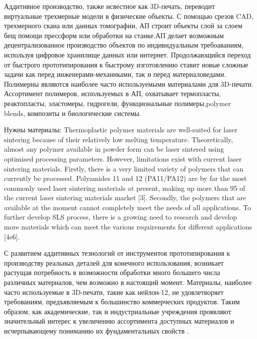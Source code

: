 

Аддитивное производство, также исвестное как 3D-печать, переводит виртуальные трехмерные модели в физические объекты. С помощью срезов CAD, трехмерного скана или данных томографии, АП строит объекты слой за слоем бещ помощи прессформ или обработки на станке.АП делает возможным децентрализованное производство объектов по индивидуальным требоаваниям, используя цифровое хранилище данных или интернет. 
Продолжающийся переход
от быстрого прототипирования к быстрому изготовлению ставит новые сложные задачи как перед инженерами-механиками, так и перед материаловедами.
Полимерны являются наиболее часто используемыми материалами для 3D-печати.
Ассортимент полимеров, используемых в АП, охватывает термопласты, реактопласты, эластомеры, гидрогели, функциональные полимеры,polymer blends, композиты и биологические системы.
\cite{3d-review}

Нужны материалы: 
Thermoplastic polymer materials are well-suited for laser sintering
because of their relatively low melting temperature. Theoretically,
almost any polymer available in powder form can be laser
sintered using optimised processing parameters. However, limitations
exist with current laser sintering materials. Firstly, there is a
very limited variety of polymers that can currently be processed.
Polyamides 11 and 12 (PA11/PA12) are by far the most commonly
used laser sintering materials at present, making up more than 95%
of the current laser sintering materials market [3]. Secondly, the
polymers that are available at the moment cannot completely meet
the needs of all applications. To further develop SLS process, there is
a growing need to research and develop more materials which can
meet the various requirements for different applications [4e6].

\cite{conditions}



С развитием аддитивных тезнологий от инструментов прототипирования к производству реальных деталей для конечного использования, возникает растущая потребность в возможности  обработки много большего числа различных материалов, чем возможно в настоящий момент. Материалы, наиболее часто используемые в 3D-печати, такие как нейлон-12, не удовлетворяет требованиям, предъявляемым к большинство коммерческих продуктов. Таким образом, как академические, так и индустриальные учреждения проявляют значительный интерес к увеличению ассортимента доступных материалов и исчерпывающему пониманию их фундаментальных свойств \cite{sls-material}.

